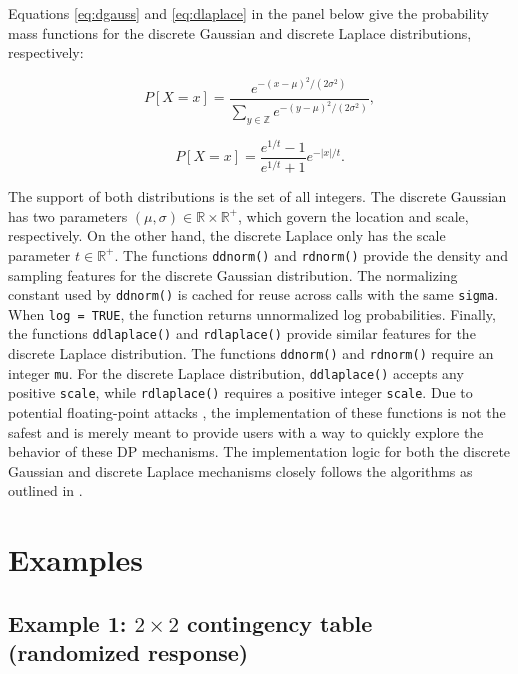Equations \eqref{eq:dgauss} and \eqref{eq:dlaplace} in the panel below give the
probability mass functions for the discrete Gaussian and discrete Laplace distributions, respectively:

\begin{equation}
P[X = x] = \dfrac{e^{-(x - \mu)^2/(2\sigma^2)}}{\sum_{y \in \mathbb{Z}} e^{-(y-\mu)^2/(2\sigma^2)}},
\label{eq:dgauss}
\end{equation}

\begin{equation}
P[X = x] = \dfrac{e^{1/t} - 1}{e^{1/t} + 1} e^{-|x|/t}.
\label{eq:dlaplace}
\end{equation}

The support of both distributions is the set of all integers. The discrete Gaussian has
two parameters \((\mu,\sigma) \in \mathbb{R} \times \mathbb{R}^+\), which govern the location and
scale, respectively. On the other hand, the discrete Laplace only has the scale parameter \(t \in \mathbb{R}^+\). The functions \texttt{ddnorm()} and \texttt{rdnorm()} provide the
density and sampling features for the discrete Gaussian distribution. The normalizing constant used by \texttt{ddnorm()} is cached for reuse across calls with
the same \texttt{sigma}. When \texttt{log\ =\ TRUE}, the function returns unnormalized log
probabilities. Finally, the functions
\texttt{ddlaplace()} and \texttt{rdlaplace()} provide similar features for the discrete Laplace distribution.
The functions \texttt{ddnorm()} and \texttt{rdnorm()} require an integer \texttt{mu}. For the discrete
Laplace distribution, \texttt{ddlaplace()} accepts any positive \texttt{scale}, while
\texttt{rdlaplace()} requires a positive integer \texttt{scale}. Due to potential floating-point attacks \citep{Mironov2012}, the implementation of these functions is not the safest and is merely meant to provide
users with a way to quickly explore the behavior of these DP mechanisms. The implementation
logic for both the discrete Gaussian and discrete Laplace mechanisms closely follows the algorithms as outlined in \citet{Canonne2022}.

\section{Examples}\label{sec:examples}

\subsection{\texorpdfstring{Example 1: \(2 \times 2\) contingency table (randomized response)}{Example 1: 2 \textbackslash times 2 contingency table (randomized response)}}\label{example-1-2-times-2-contingency-table-randomized-response}

